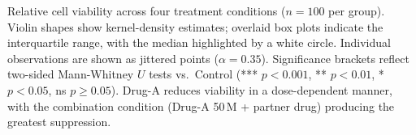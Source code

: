 \caption{Relative cell viability across four treatment conditions ($n = 100$ per group).
Violin shapes show kernel-density estimates; overlaid box plots indicate the interquartile
range, with the median highlighted by a white circle.
Individual observations are shown as jittered points ($\alpha = 0.35$).
Significance brackets reflect two-sided Mann-Whitney $U$ tests vs.\ Control
(*** $p < 0.001$, ** $p < 0.01$, * $p < 0.05$, ns $p \geq 0.05$).
Drug-A reduces viability in a dose-dependent manner, with the combination condition
(Drug-A 50\,\textmu M + partner drug) producing the greatest suppression.}
